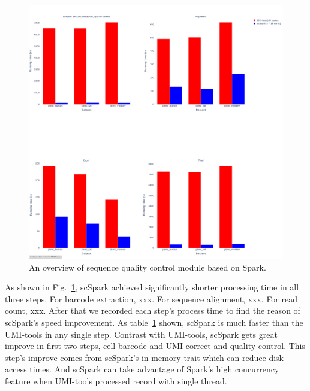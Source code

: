 \documentclass[conference]{IEEEtran}
\begin{document}

\begin{figure}
	\includegraphics[width=\textwidth]{Fig4.pdf}
	\caption{An overview of sequence quality control module based on Spark.} \label{fig4}
\end{figure}

As shown in Fig.~\ref{fig4}, scSpark achieved significantly shorter processing time in all three steps. 
For barcode extraction, xxx. 
For sequence alignment, xxx.
For read count, xxx.
\iffalse
After that we recorded each step's process time to find the reason of scSpark's speed improvement.
As table~\ref{fig4} shown, scSpark is much faster than the UMI-tools in any single step.
Contrast with UMI-tools, scSpark gets great improve in first two steps, cell barcode and UMI correct and quality control.
This step's improve comes from scSpark's in-memory trait which can reduce disk access times.
And scSpark can take advantage of Spark's high concurrency feature when UMI-tools processed record with single thread.
\end{document}
